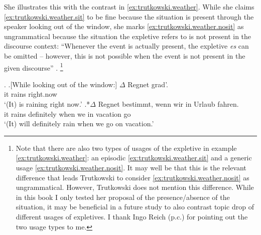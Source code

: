 \noindent
She illustrates this with the contrast in \ref{ex:trutkowski.weather}.
While she claims \ref{ex:trutkowski.weather.sit} to be fine because the situation is present through the speaker looking out of the window, she marks \ref{ex:trutkowski.weather.nosit} as ungrammatical because the situation the expletive refers to is not present in the discourse context:
``Whenever the event is actually present, the expletive \textit{es} can be omitted -- however, this is not possible when the event is not present in the given discourse'' \citep[120]{trutkowski2016}.%
\footnote{Note that there are also two types of usages of the expletive  in example \ref{ex:trutkowski.weather}: an episodic \ref{ex:trutkowski.weather.sit} and a generic usage \ref{ex:trutkowski.weather.nosit}.
It may well be that this is the relevant difference that leads Trutkowski to consider \ref{ex:trutkowski.weather.nosit} as ungrammatical.
However,  Trutkowski does not mention this difference.
While in this book I only tested her proposal of the presence/absence of the situation, it may be beneficial in a future study to also contrast topic drop of different usages of expletives.
I thank Ingo Reich (p.c.) for pointing out the two usage types to me.
}

\ex.\label{ex:trutkowski.weather}
\ag.\label{ex:trutkowski.weather.sit}{[While looking out of the window:]} $\Delta$ Regnet grad'.\\
{} it rains right.now\\
[While looking out of the window:] `(It) is raining right now.'
\bg.*\label{ex:trutkowski.weather.nosit}$\Delta$ Regnet bestimmt, wenn wir in Urlaub fahren.\\
it rains definitely when we in vacation go\\
`(It) will definitely rain when we go on vacation.'\\\phantom{.} \hfill \citep[120, her judgments]{trutkowski2016}

